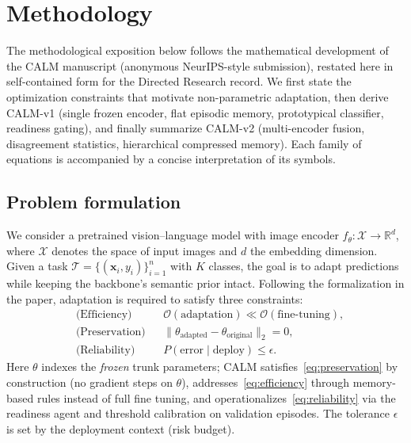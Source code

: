 \documentclass[12pt,a4paper]{report}
\begin{document}
\chapter{Methodology}
\label{ch:meth}

The methodological exposition below follows the mathematical development of the CALM manuscript (anonymous NeurIPS-style submission), restated here in self-contained form for the Directed Research record. We first state the optimization constraints that motivate non-parametric adaptation, then derive CALM-v1 (single frozen encoder, flat episodic memory, prototypical classifier, readiness gating), and finally summarize CALM-v2 (multi-encoder fusion, disagreement statistics, hierarchical compressed memory). Each family of equations is accompanied by a concise interpretation of its symbols.

\section{Problem formulation}
We consider a pretrained vision--language model with image encoder $f_\theta : \mathcal{X} \to \mathbb{R}^d$, where $\mathcal{X}$ denotes the space of input images and $d$ the embedding dimension. Given a task $\mathcal{T} = \{(\mathbf{x}_i, y_i)\}_{i=1}^{n}$ with $K$ classes, the goal is to adapt predictions while keeping the backbone's semantic prior intact. Following the formalization in the paper, adaptation is required to satisfy three constraints:
\begin{align}
  &\text{(Efficiency)} && \mathcal{O}(\text{adaptation}) \ll \mathcal{O}(\text{fine-tuning}), \label{eq:efficiency}\\
  &\text{(Preservation)} && \|\theta_{\text{adapted}} - \theta_{\text{original}}\|_2 = 0, \label{eq:preservation}\\
  &\text{(Reliability)} && P(\text{error} \mid \text{deploy}) \le \epsilon. \label{eq:reliability}
\end{align}
Here $\theta$ indexes the \emph{frozen} trunk parameters; CALM satisfies~\eqref{eq:preservation} by construction (no gradient steps on $\theta$), addresses~\eqref{eq:efficiency} through memory-based rules instead of full fine tuning, and operationalizes~\eqref{eq:reliability} via the readiness agent and threshold calibration on validation episodes. The tolerance $\epsilon$ is set by the deployment context (risk budget).
\end{document}
